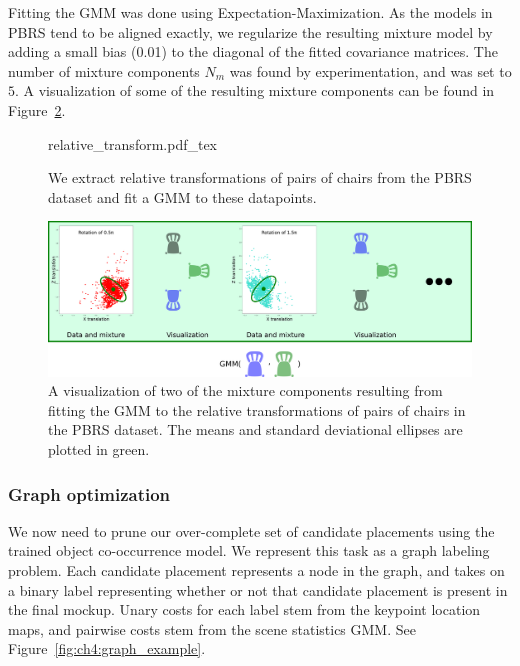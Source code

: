 \documentclass[10pt,twocolumn,letterpaper]{article}
\begin{document}
Fitting the GMM was done using Expectation-Maximization. As the models in \textsc{PBRS} tend to be 
aligned exactly, we regularize the resulting mixture model by adding a small bias (0.01) to the diagonal
of the fitted covariance matrices. The number of mixture components $N_m$ was found by experimentation, and was set to $5$.
A visualization of some of the resulting mixture components can be found in Figure~\ref{fig:ch4:mixture_components}.

\begin{figure}
    \def\svgwidth{\linewidth}
    {relative_transform.pdf_tex}
    \caption[GMM visualization]{We extract relative transformations of pairs of chairs from the PBRS dataset and fit a GMM to these datapoints.}
    \label{fig:ch4:relative_transform}
\end{figure}

\begin{figure}
    \includegraphics[width=\linewidth]{figures/mixture_components/mixture_components}
    \caption[Mixture components]{A visualization of two of the mixture components resulting from fitting the GMM to the relative transformations of pairs of chairs in the PBRS dataset. The means and standard deviational ellipses are plotted in green.}
    \label{fig:ch4:mixture_components}
\end{figure}

\subsubsection{Graph optimization}
\label{ssec:ch4:graph_optimization}
We now need to prune our over-complete set of candidate placements using the
trained object co-occurrence model. We represent this task as a graph labeling
problem.  Each candidate placement represents a node in the graph, and takes on
a binary label representing whether or not that candidate placement is present
in the final mockup. Unary costs for each label stem from the keypoint location
maps, and pairwise costs stem from the scene statistics GMM.  See
Figure~\ref{fig:ch4:graph_example}.
\end{document}
